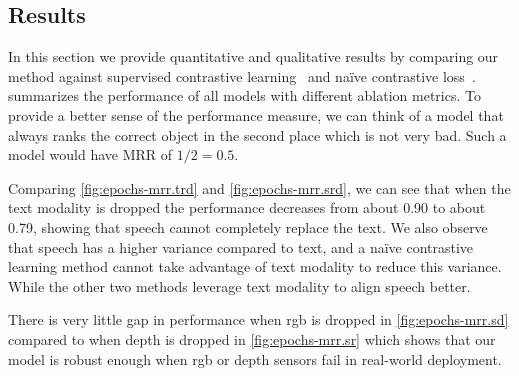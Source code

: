 \documentclass[sigconf,natbib=true,anonymous=true]{acmart}
\begin{document}
\subsection{Results}
\label{sec:results}
In this section we provide quantitative and qualitative results by comparing our method against supervised contrastive learning~\cite{NEURIPS2020_supervised_contrastive} and na\"ive contrastive loss~\cite{chen2020simple}.
 summarizes the performance of all models with different ablation metrics.
To provide a better sense of the performance measure, we can think of a model that always ranks the correct object in the second place which is not very bad. Such a model would have MRR of $1/2 = 0.5$.


Comparing \cref{fig:epochs-mrr.trd} and \cref{fig:epochs-mrr.srd}, we can see that when the text modality is dropped the performance decreases from about 0.90 to about 0.79, showing that speech cannot completely replace the text. 
We also observe that speech has a higher variance compared to text, and a na\"ive contrastive learning method cannot take advantage of text modality to reduce this variance. While the other two methods leverage text modality to align speech better.

There is very little gap in performance when rgb is dropped in \cref{fig:epochs-mrr.sd} compared to when depth is dropped in \cref{fig:epochs-mrr.sr} which shows that our model is robust enough when rgb or depth sensors fail in real-world deployment.
\end{document}
